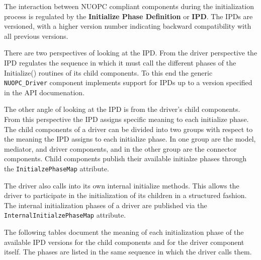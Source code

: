 %

\label{IPD}

The interaction between NUOPC compliant components during the initialization process is regulated by the {\bf Initialize Phase Definition} or {\bf IPD}. The IPDs are versioned, with a higher version number indicating backward compatibility with all previous versions.

There are two perspectives of looking at the IPD. From the driver perspective the IPD regulates the sequence in which it must call the different phases of the Initialize() routines of its child components. To this end the generic {\tt NUOPC\_Driver} component implements support for IPDs up to a version specified in the API documenation.

The other angle of looking at the IPD is from the driver's child components. From this perspective the IPD assigns specific meaning to each initialize phase. The child components of a driver can be divided into two groups with respect to the meaning the IPD assigns to each initialize phase. In one group are the model, mediator, and driver components, and in the other group are the connector components. Child components publish their available initialze phases through the {\tt InitialzePhaseMap} attribute.

The driver also calls into its own internal initialize methods. This allows the driver to participate in the initialization of its children in a structured fashion. The internal initialization phases of a driver are published via the {\tt InternalInitialzePhaseMap} attribute.

The following tables document the meaning of each initialization phase of the available IPD versions for the child components and for the driver component itself. The phases are listed in the same sequence in which the driver calls them.
\newline

